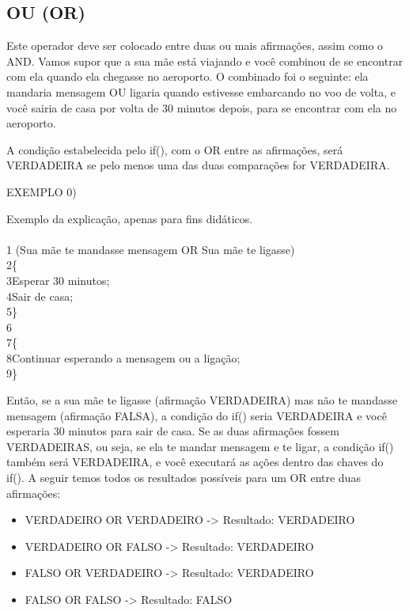 \documentclass[conference]{IEEEtran}
\begin{document}
\begin{center}
\subsection{OU (OR)}
\end{center}
\par
Este operador deve ser colocado entre duas ou mais afirmações, assim como o AND. Vamos supor que a sua mãe está viajando e você combinou de se encontrar com ela quando ela chegasse no aeroporto. O combinado foi o seguinte: ela mandaria mensagem OU ligaria quando estivesse embarcando no voo de volta, e você sairia de casa por volta de 30 minutos depois, para se encontrar com ela no aeroporto.
\par
A condição estabelecida pelo if(), com o OR entre as afirmações, será VERDADEIRA se pelo menos uma das duas comparações for VERDADEIRA.
\\
\begin{center}
EXEMPLO 0)
\end{center}
\par
Exemplo da explicação, apenas para fins didáticos.
\\
\\
{\selectfont 
{\color{cinza}1} (Sua mãe te mandasse mensagem OR Sua mãe te ligasse)\\
{\color{cinza}2}\quad\{\\
{\color{cinza}3}\quad\quad Esperar 30 minutos;\\
{\color{cinza}4}\quad\quad Sair de casa;\\
{\color{cinza}5}\quad\}\\
{\color{cinza}6}\\
{\color{cinza}7}\quad\{\\
{\color{cinza}8}\quad\quad Continuar esperando a mensagem ou a ligação;\\
{\color{cinza}9}\quad\}}
\\
\par
Então, se a sua mãe te ligasse (afirmação VERDADEIRA) mas não te mandasse mensagem (afirmação FALSA), a condição do if() seria VERDADEIRA e você esperaria 30 minutos para sair de casa. Se as duas afirmações fossem VERDADEIRAS, ou seja, se ela te mandar mensagem e te ligar, a condição if() também será VERDADEIRA, e você executará as ações dentro das chaves do if(). A seguir temos todos os resultados possíveis para um OR entre duas afirmações:
\begin{itemize}
    \item VERDADEIRO OR VERDADEIRO -> Resultado: VERDADEIRO
    \item VERDADEIRO OR FALSO -> Resultado: VERDADEIRO
    \item FALSO OR VERDADEIRO -> Resultado: VERDADEIRO
    \item FALSO OR FALSO -> Resultado: FALSO
\end{itemize}
\end{document}
